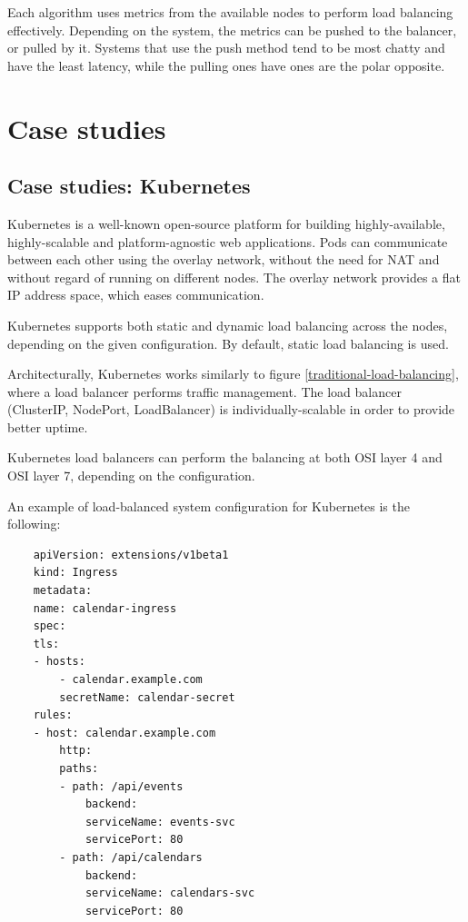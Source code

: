 \documentclass[conference]{IEEEtran}
\begin{document}
    Each algorithm uses metrics from the available nodes to perform load balancing effectively. Depending on the system, the
metrics can be pushed to the balancer, or pulled by it. Systems that use the push method tend to be
most chatty and have the least latency, while the pulling ones have ones are the polar opposite.

\section{Case studies}

\subsection{Case studies: Kubernetes}
    Kubernetes is a well-known open-source platform for building highly-available, highly-scalable and platform-agnostic web applications.
Pods can communicate between each other using the overlay network, without the need for NAT and without regard of running
on different nodes. The overlay network provides a flat IP address space, which eases communication.

    Kubernetes supports both static and dynamic load balancing across the nodes, depending on the given configuration.
By default, static load balancing is used.

    Architecturally, Kubernetes works similarly to figure \ref{traditional-load-balancing}, where a load balancer performs
traffic management. The load balancer (ClusterIP, NodePort, LoadBalancer) is individually-scalable in order to provide
better uptime.

    Kubernetes load balancers can perform the balancing at both OSI layer 4 and OSI layer 7, depending on the configuration.

    An example of load-balanced system configuration for Kubernetes is the following:

    \begin{center}
        \begin{lstlisting}
    apiVersion: extensions/v1beta1
    kind: Ingress
    metadata:
    name: calendar-ingress
    spec:
    tls:
    - hosts:
        - calendar.example.com
        secretName: calendar-secret
    rules:
    - host: calendar.example.com
        http:
        paths:
        - path: /api/events
            backend:
            serviceName: events-svc
            servicePort: 80
        - path: /api/calendars
            backend:
            serviceName: calendars-svc
            servicePort: 80
        \end{lstlisting}
         \label{kubernetes-load-balancing-example}
    \end{center}
\end{document}
